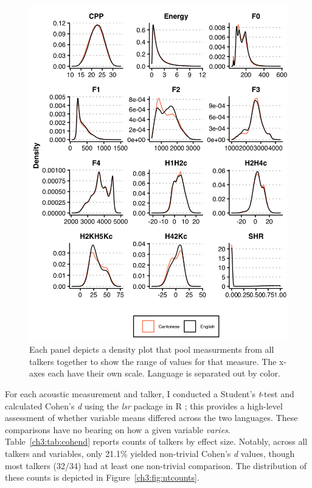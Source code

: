 \begin{figure}[htbp]
    \begin{center}
    \includegraphics[width=\linewidth]{figures/ch3_allmeasuresdensity_5in.png} 
    \caption{Each panel depicts a density plot that pool measurments from all talkers together to show the range of values for that measure. The x-axes each have their own scale. Language is separated out by color.}
    \label{ch3:fig:allmeasures}
    \end{center}
\end{figure}

For each acoustic measurement and talker, I conducted a Student's \textit{t}-test and calculated Cohen's \textit{d} using the \textit{lsr} package \citep{navarro_2015_lsr} in R \citep{r_2021}; this provides a high-level assessment of whether variable means differed across the two languages. These comparisons have no bearing on how a given variable \textit{varies}. Table~\ref{ch3:tab:cohend} reports counts of talkers by effect size. Notably, across all talkers and variables, only 21.1\% yielded non-trivial Cohen's \textit{d} values, though most talkers (32/34) had at least one non-trivial comparison. The distribution of these counts is depicted in Figure~\ref{ch3:fig:ntcounts}. 

